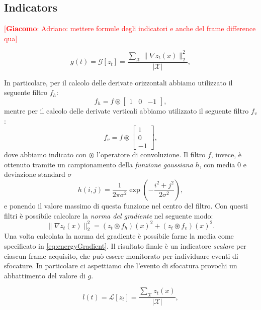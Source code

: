 \documentclass{llncs}
\newcommand{\gi}[1]{{\textcolor{red}{[\small \textbf{Giacomo}: #1]}}}
\begin{document}
\subsection{Indicators}\label{subsec:Indicators}
\gi{Adriano: mettere formule degli indicatori e anche del frame difference qua}

\begin{equation}
\label{eq:energyGradient}
g(t) = \mathcal{G}[z_t] =\frac{\sum_{\mathcal{X}}\| \nabla z_t(x) \| _2^2 }{|\mathcal{X}|} ,
\end{equation}  

In particolare, per il calcolo delle derivate orizzontali  abbiamo utilizzato il seguente filtro $f_h$:
\[f_h = f \circledast \left[ \begin{array}{rcl}
1 & 0 & -1
\end{array}\right], \] 
mentre per il calcolo delle derivate verticali abbiamo utilizzato il seguente filtro $f_v$:
\[f_v = f \circledast \left[ \begin{array}{r}
1 \\ 0 \\ -1
\end{array}\right], \]
dove abbiamo indicato con $\circledast$ l'operatore di convoluzione.
Il filtro $f$, invece, \`e ottenuto tramite un campionamento della \textit{funzione gaussiana} $h$, con media $0$ e deviazione standard $\sigma$
\begin{equation}
\label{eq:gaussian}
h(i,j)=\frac{1}{2\pi\sigma^2}\exp\left(-\frac{i^2+j^2}{2\sigma^2}\right),
\end{equation}
e ponendo il valore massimo di questa funzione nel centro del filtro.
Con questi filtri \`e possibile calcolare la \textit{norma del gradiente} nel seguente modo:
\begin{equation}
\label{eq:normaGradiente}
\| \nabla z_t(x) \|_2^2=\left(z_t \circledast f_h\right)(x)^2 + \left(z_t \circledast f_v\right)(x)^2.
\end{equation}
Una volta calcolata la norma del gradiente \`e possibile farne la media come specificato in \eqref{eq:energyGradient}.
Il risultato finale \`e un indicatore \textit{scalare} per ciascun frame acquisito, che pu\`o essere monitorato per individuare eventi di sfocature. 
In particolare ci aspettiamo che l'evento di sfocatura provochi un abbattimento del valore di $g$.



\begin{equation}
\label{eq:energyLuma}
l(t) = \mathcal{L}[z_t] =\frac{\sum_{\mathcal{X}} z_t(x) }{|\mathcal{X}|} ,
\end{equation}  
\end{document}
